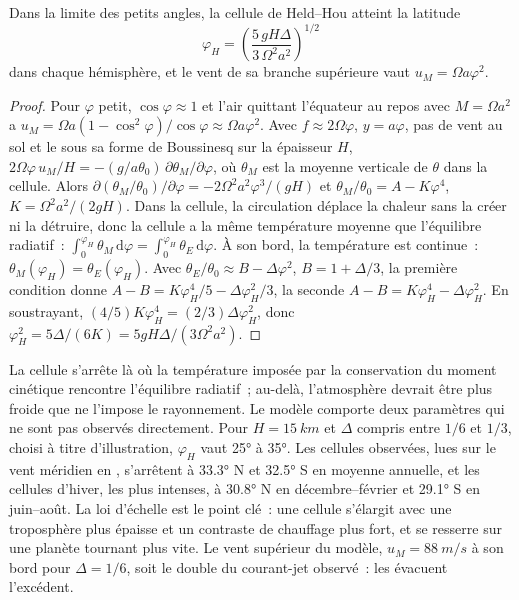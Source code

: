 \begin{theorem}\label{thm:b3:atmospheric-dynamics:held-hou}
Dans la limite des petits angles, la cellule de Held--Hou atteint la latitude
\[
\varphi_H = \left(\frac{5\,gH\Delta}{3\,\Omega^2a^2}\right)^{1/2}
\]
dans chaque hémisphère, et le vent de sa branche supérieure vaut $u_M = \Omega
a\varphi^2$.
\end{theorem}

\begin{proof}
Pour $\varphi$ petit, $\cos\varphi \approx 1$ et l'air quittant l'équateur au
repos avec $M = \Omega a^2$ a $u_M = \Omega a(1 - \cos^2\varphi)/\cos\varphi
\approx \Omega a\varphi^2$. Avec $f \approx 2\Omega\varphi$, $y = a\varphi$,
pas de vent au sol et le  sous sa forme de Boussinesq sur la
épaisseur $H$, $2\Omega\varphi\,u_M/H = -(g/a\theta_0)\,\partial\theta_M/
\partial\varphi$, où $\theta_M$ est la moyenne verticale de $\theta$ dans la
cellule. Alors $\partial(\theta_M/\theta_0)/\partial\varphi = -2\Omega^2a^2
\varphi^3/(gH)$ et $\theta_M/\theta_0 = A - K\varphi^4$, $K = \Omega^2a^2/
(2gH)$. Dans la cellule, la circulation déplace la chaleur sans la créer ni la
détruire, donc la cellule a la même température moyenne
que l'équilibre radiatif~: $\int_0^{\varphi_H}\theta_M\,\mathrm d\varphi = \int_0^{\varphi_H}
\theta_E\,\mathrm d\varphi$. À son bord, la température est continue~:
$\theta_M(\varphi_H) = \theta_E(\varphi_H)$. Avec $\theta_E/\theta_0 \approx
B - \Delta\varphi^2$, $B = 1 + \Delta/3$, la première condition donne $A - B =
K\varphi_H^4/5 - \Delta\varphi_H^2/3$, la seconde $A - B = K\varphi_H^4 -
\Delta\varphi_H^2$. En soustrayant, $(4/5)K\varphi_H^4 = (2/3)\Delta
\varphi_H^2$, donc $\varphi_H^2 = 5\Delta/(6K) = 5gH\Delta/(3\Omega^2a^2)$.
\end{proof}

La cellule s'arrête là où la température imposée par la conservation du
moment cinétique rencontre l'équilibre radiatif~; au-delà, l'atmosphère devrait être
plus froide que ne l'impose le rayonnement. Le modèle comporte deux paramètres qui ne
sont pas observés directement. Pour $H = \qty{15}{km}$ et $\Delta$ compris entre $1/6$ et
$1/3$, choisi à titre d'illustration, $\varphi_H$ vaut \ang{25} à \ang{35}. Les
cellules observées, lues sur le vent méridien en , s'arrêtent à
\ang{33.3} N et \ang{32.5} S en moyenne annuelle, et les cellules d'hiver,
les plus intenses, à \ang{30.8} N en décembre--février et \ang{29.1} S en
juin--août. La loi d'échelle est le point clé~: une cellule s'élargit avec une
troposphère plus épaisse et un contraste de chauffage plus fort, et se resserre sur une
planète tournant plus vite. Le vent supérieur du modèle, $u_M =
\qty{88}{m/s}$ à son bord pour $\Delta = 1/6$, soit le double du courant-jet observé~:
les  évacuent l'excédent.

